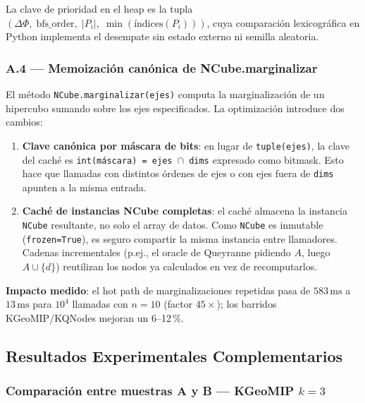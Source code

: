 La clave de prioridad en el heap es la tupla
$(\Delta\Phi,\; \text{bfs\_order},\; |P_i|,\; \min(\text{índices}(P_i)))$,
cuya comparación lexicográfica en Python implementa el desempate sin
estado externo ni semilla aleatoria.

\subsubsection*{A.4 — Memoización canónica de NCube.marginalizar }

El método \texttt{NCube.marginalizar(ejes)} computa la marginalización
de un hipercubo sumando sobre los ejes especificados.
La optimización introduce dos cambios:

\begin{enumerate}
  \item \textbf{Clave canónica por máscara de bits}:
        en lugar de \texttt{tuple(ejes)}, la clave del caché es
        \texttt{int(máscara) = ejes $\cap$ dims} expresado como bitmask.
        Esto hace que llamadas con distintos órdenes de ejes o con ejes
        fuera de \texttt{dims} apunten a la misma entrada.

  \item \textbf{Caché de instancias NCube completas}:
        el caché almacena la instancia \texttt{NCube} resultante, no solo el
        array de datos.
        Como \texttt{NCube} es inmutable (\texttt{frozen=True}),
        es seguro compartir la misma instancia entre llamadores.
        Cadenas incrementales (p.ej., el oracle de Queyranne pidiendo
        $A$, luego $A \cup \{d\}$) reutilizan los nodos ya calculados
        en vez de recomputarlos.
\end{enumerate}

\textbf{Impacto medido}: el hot path de marginalizaciones repetidas
pasa de $583\,\text{ms}$ a $13\,\text{ms}$ para $10^4$ llamadas con $n=10$
(factor $45\times$); los barridos KGeoMIP/KQNodes mejoran un 6--12\,\%.

\subsection{Resultados Experimentales Complementarios}

\subsubsection*{Comparación entre muestras A y B — KGeoMIP $k=3$}


